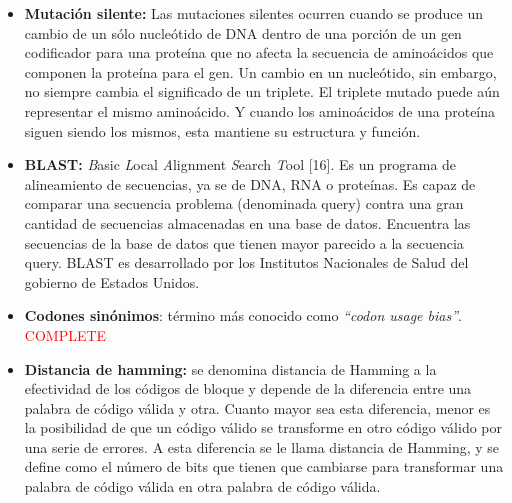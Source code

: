 \begin{itemize}
	\item \textbf{Mutación silente:} Las mutaciones silentes ocurren cuando se produce un cambio de un sólo nucleótido de DNA dentro de una porción de un 										gen codificador para una proteína que no afecta la secuencia de aminoácidos que componen la proteína para el gen. Un 										cambio en un nucleótido, sin embargo, no siempre cambia el significado de un triplete. El triplete mutado puede aún 									representar el mismo aminoácido. Y cuando los aminoácidos de una proteína siguen siendo los mismos, esta mantiene su 										estructura y función.				
	\item \textbf{BLAST:} \textit{B}asic \textit{L}ocal \textit{A}lignment \textit{S}earch \textit{T}ool [16]. Es un programa de alineamiento de 										secuencias, ya se de DNA, RNA o proteínas. Es capaz de comparar una secuencia problema (denominada query) contra una 										gran cantidad de secuencias almacenadas en una base de datos. Encuentra las secuencias de la base de datos que tienen 										mayor parecido a la secuencia query. BLAST es desarrollado por los Institutos Nacionales de Salud del gobierno de 										Estados Unidos.
	\item \textbf{Codones sinónimos}: término más conocido como \textit{``codon usage bias''}. \textcolor{red}{COMPLETE}


	\item \textbf{Distancia de hamming:} se denomina distancia de Hamming a la efectividad de los códigos de bloque y depende de la diferencia entre una 											palabra de código válida y otra. Cuanto mayor sea esta diferencia, menor es la posibilidad de que un código válido 											se transforme en otro código válido por una serie de errores. A esta diferencia se le llama distancia de Hamming, y 										se define como el número de bits que tienen que cambiarse para transformar una palabra de código válida en otra 										palabra de código válida.
\end{itemize}

